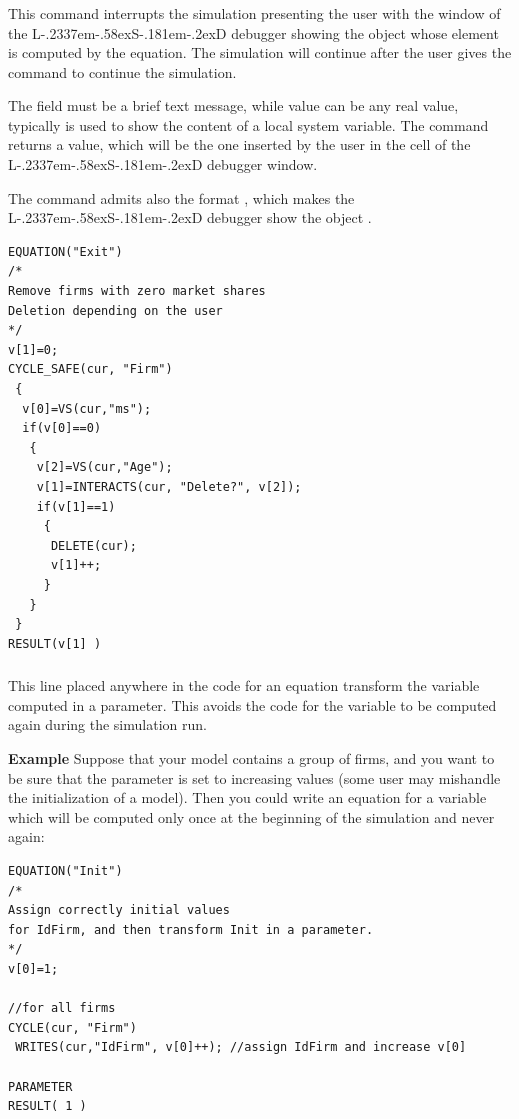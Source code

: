 \documentclass [11pt,a4paper] {book}
\def\LsD{{L\kern-.2337em\lower-.58ex\hbox{S}\kern-.181em\lower-.2ex\hbox{D}}\xspace}
\begin{document}
\subsubsection{}
This command interrupts the simulation presenting the user with the window of the \LsD debugger showing the object whose element is computed by the equation. The simulation will continue after the user gives the command to continue the simulation.

The field  must be a brief text message, while value can be any real value, typically is used to show the content of a local system variable. The command returns a value, which will be the one inserted by the user in the cell of the \LsD debugger window.

The command admits also the format , which makes the \LsD debugger show the object .

\small
\begin{verbatim}
EQUATION("Exit")
/*
Remove firms with zero market shares
Deletion depending on the user
*/
v[1]=0;
CYCLE_SAFE(cur, "Firm")
 {
  v[0]=VS(cur,"ms");
  if(v[0]==0)
   {
    v[2]=VS(cur,"Age");
    v[1]=INTERACTS(cur, "Delete?", v[2]);
    if(v[1]==1)
     {
      DELETE(cur);
      v[1]++;
     } 
   } 
 }
RESULT(v[1] )
\end{verbatim}
\normalsize


\subsubsection{}
This line placed anywhere in the code for an equation transform the variable computed in
a parameter. This avoids the code for the variable to be computed again during the
simulation run.

\textbf{Example} Suppose that your model contains a group of firms, and you want to be
sure that the parameter  is set to increasing values (some user may mishandle
the initialization of a model). Then you could write an equation for a variable
 which will be computed only once at the beginning of the simulation and never again:

 \small
\begin{verbatim}
EQUATION("Init")
/*
Assign correctly initial values
for IdFirm, and then transform Init in a parameter.
*/
v[0]=1;

//for all firms
CYCLE(cur, "Firm")
 WRITES(cur,"IdFirm", v[0]++); //assign IdFirm and increase v[0]

PARAMETER
RESULT( 1 )
\end{verbatim}
\normalsize
\end{document}
